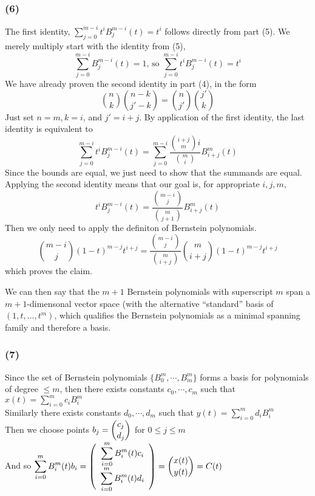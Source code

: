 \documentclass{article}
\begin{document}
\subsubsection{(6)}
The first identity, $\displaystyle{\sum_{j=0}^{m-i}t^iB_j^{m-i}(t)} = t^i$ follows
directly from part (5). We merely multiply start with the identity from (5),
\[ \sum_{j=0}^{m-i}B^{m-i}_j(t) = 1 \textrm{, so }
\sum_{j=0}^{m-i}t^iB^{m-i}_j(t)=t^i \]
We have already proven the second identity in part (4), in the form 
\[\binom{n}{k}\binom{n-k}{j'-k} = \binom{n}{j'}\binom{j'}{k}\]
Just set $n = m, k = i$, and $j' = i + j$.
\medskip
By application of the first identity, the last identity is equivalent to
\[\sum_{j=0}^{m-i}t^iB_j^{m-i}(t) =
\sum_{j=0}^{m-i}\frac{\binom{i+j}{m}{i}}{\binom{m}{i}}B_{i+j}^m(t)\]
Since the bounds are equal, we just need to show that the summands are equal.
Applying the second identity means that our goal is, for appropriate $i,j,m,$
\[t^iB_j^{m-i}(t) = \frac{\binom{m-i}{j}}{\binom{m}{j+1}}B_{i+j}^m(t)\]
Then we only need to apply the definiton of Bernstein polynomials.
\[\binom{m-i}{j}(1-t)^{m-j}t^{i+j} =
\frac{\binom{m-i}{j}}{\binom{m}{i+j}}\binom{m}{i+j}(1-t)^{m-j}t^{i+j}\]
which proves the claim.

\medskip
We can then say that the $m + 1$ Bernstein polynomials with superscript $m$ span
a $m+1$-dimensonal vector space (with the alternative ``standard''
basis of $(1,t,\dots,t^m)$, which qualifies the Bernstein polynomials as a
minimal spanning family and therefore a basis.

\subsubsection{(7)}
Since the set of Bernstein polynomials $\{B_0^m,\cdots,B_m^m\}$ forms a basis for polynomials of degree $\le m$, then there exists constants $c_0,\cdots,c_m$ such that $x(t)=\displaystyle\sum_{i=0}^m c_i B_i^m$
\\Similarly there exists constants $d_0,\cdots,d_m$ such that $y(t)=\displaystyle\sum_{i=0}^m d_i B_i^m$
\\Then we choose points $b_j=\dbinom{c_j}{d_j}$ for $0\le j \le m$
\\And so $\displaystyle\sum_{i=0}^m B_i^m(t) b_i = \left(\begin{array}{c}\displaystyle\sum_{i=0}^m B_i^m(t) c_i\\ \displaystyle\sum_{i=0}^m B_i^m(t) d_i\end{array}\right) = \dbinom{x(t)}{y(t)}=C(t)$
\end{document}
